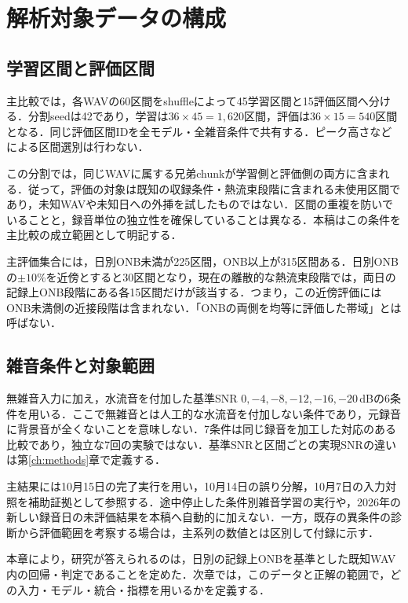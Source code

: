 \section{解析対象データの構成}
\subsection{学習区間と評価区間}
主比較では，各WAVの60区間をshuffleによって45学習区間と15評価区間へ分ける．分割seedは42であり，学習は$36\times45=1,620$区間，評価は$36\times15=540$区間となる．同じ評価区間IDを全モデル・全雑音条件で共有する．ピーク高さなどによる区間選別は行わない．

この分割では，同じWAVに属する兄弟chunkが学習側と評価側の両方に含まれる．従って，評価の対象は既知の収録条件・熱流束段階に含まれる未使用区間であり，未知WAVや未知日への外挿を試したものではない．区間の重複を防いでいることと，録音単位の独立性を確保していることは異なる．本稿はこの条件を主比較の成立範囲として明記する．

主評価集合には，日別ONB未満が225区間，ONB以上が315区間ある．日別ONBの$\pm10\%$を近傍とすると30区間となり，現在の離散的な熱流束段階では，両日の記録上ONB段階にある各15区間だけが該当する．つまり，この近傍評価にはONB未満側の近接段階は含まれない．「ONBの両側を均等に評価した帯域」とは呼ばない．

\subsection{雑音条件と対象範囲}
無雑音入力に加え，水流音を付加した基準SNR $0,-4,-8,-12,-16,-20$\,dBの6条件を用いる．ここで無雑音とは人工的な水流音を付加しない条件であり，元録音に背景音が全くないことを意味しない．7条件は同じ録音を加工した対応のある比較であり，独立な7回の実験ではない．基準SNRと区間ごとの実現SNRの違いは第\ref{ch:methods}章で定義する．

主結果には10月15日の完了実行を用い，10月14日の誤り分解，10月7日の入力対照を補助証拠として参照する．途中停止した条件別雑音学習の実行や，2026年の新しい録音日の未評価結果を本稿へ自動的に加えない．一方，既存の異条件の診断から評価範囲を考察する場合は，主系列の数値とは区別して付録に示す．

本章により，研究が答えられるのは，日別の記録上ONBを基準とした既知WAV内の回帰・判定であることを定めた．次章では，このデータと正解の範囲で，どの入力・モデル・統合・指標を用いるかを定義する．
